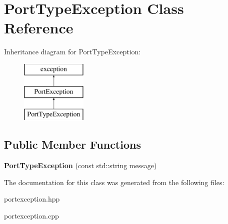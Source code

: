 \hypertarget{class_port_type_exception}{}\section{Port\+Type\+Exception Class Reference}
\label{class_port_type_exception}
Inheritance diagram for Port\+Type\+Exception\+:\begin{figure}[H]
\begin{center}
\leavevmode
\includegraphics[height=3.000000cm]{class_port_type_exception}
\end{center}
\end{figure}
\subsection*{Public Member Functions}
\begin{DoxyCompactItemize}
\item 
\hypertarget{class_port_type_exception_aa3154797084de9cfe74b653bf3e63ee2}{}{\bfseries Port\+Type\+Exception} (const std\+::string message)\label{class_port_type_exception_aa3154797084de9cfe74b653bf3e63ee2}

\end{DoxyCompactItemize}


The documentation for this class was generated from the following files\+:\begin{DoxyCompactItemize}
\item 
portexception.\+hpp\item 
portexception.\+cpp\end{DoxyCompactItemize}
